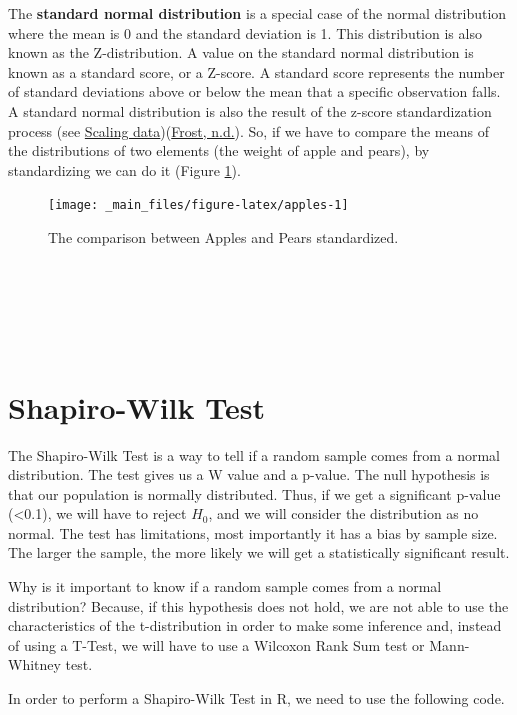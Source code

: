 \documentclass[
]{svmono}
\begin{document}
The \textbf{standard normal distribution} is a special case of the normal
distribution where the mean is 0 and the standard deviation is 1. This
distribution is also known as the Z-distribution. A value on the
standard normal distribution is known as a standard score, or a Z-score.
A standard score represents the number of standard deviations above or
below the mean that a specific observation falls. A standard normal
distribution is also the result of the z-score standardization process
(see \protect\hyperlink{scaling-data}{Scaling data})(\protect\hyperlink{ref-frost}{Frost, n.d.}). So, if we have to compare the means of the
distributions of two elements (the weight of apple and pears), by
standardizing we can do it (Figure \ref{fig:apples}).

\begin{figure}[H]

{\centering \texttt{[image: \_main\_files/figure-latex/apples-1]} 

}

\caption{The comparison between Apples and Pears standardized.}\label{fig:apples}
\end{figure}

~

~

~

\hypertarget{shapiro-wilk-test}{%
\section{Shapiro-Wilk Test}\label{shapiro-wilk-test}}

The Shapiro-Wilk Test is a way to tell if a random sample comes from a
normal distribution. The test gives us a W value and a p-value. The null
hypothesis is that our population is normally distributed. Thus, if we
get a significant p-value (\textless0.1), we will have to reject \(H_0\), and we
will consider the distribution as no normal. The test has limitations,
most importantly it has a bias by sample size. The larger the sample,
the more likely we will get a statistically significant result.

Why is it important to know if a random sample comes from a normal
distribution? Because, if this hypothesis does not hold, we are not able
to use the characteristics of the t-distribution in order to make some
inference and, instead of using a T-Test, we will have to use a Wilcoxon
Rank Sum test or Mann-Whitney test.

In order to perform a Shapiro-Wilk Test in R, we need to use the
following code.
\end{document}
